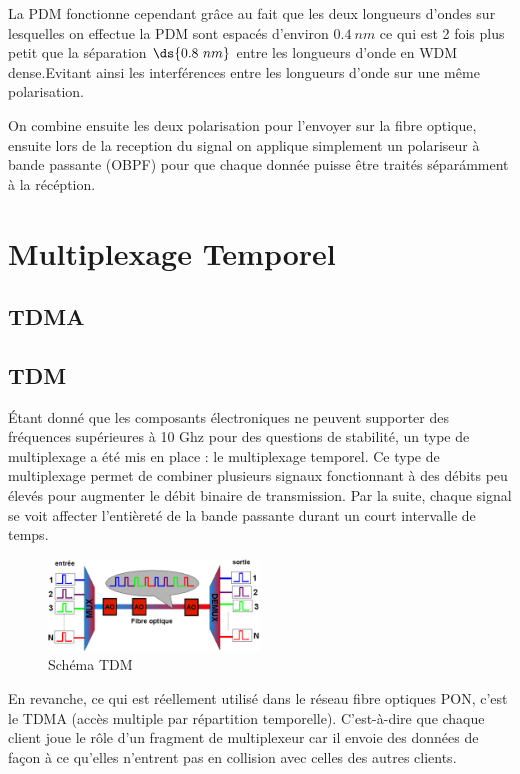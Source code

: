 \documentclass[oneside]{book}
\begin{document}
		La PDM fonctionne cependant grâce au fait que les deux longueurs d'ondes sur lesquelles on effectue la PDM sont espacés d'environ $0.4\ nm$ ce qui est 2 fois plus petit que la séparation $\ds{0.8\ nm}$ entre les longueurs d'onde en WDM dense\cite{DWDM}.Evitant ainsi les interférences entre les longueurs d'onde sur une même polarisation.

		On combine ensuite les deux polarisation pour l'envoyer sur la fibre optique, ensuite lors de la reception du signal on applique simplement un polariseur à bande passante (OBPF) pour que chaque donnée puisse être traités séparámment à la récéption.   

		\section{Multiplexage Temporel}

		\subsection{TDMA}

		\subsection{TDM}

		Étant donné que les composants électroniques ne peuvent supporter des fréquences supérieures à 10 Ghz pour des questions de stabilité, un type de multiplexage a été mis en place : le multiplexage temporel. Ce type de multiplexage permet de combiner plusieurs signaux fonctionnant à des débits peu élevés pour augmenter le débit binaire de transmission. Par la suite, chaque signal se voit affecter l’entièreté de la bande passante durant un court intervalle de temps\cite{wiki1}\cite{wiki2}.

		\begin{figure}[ht!]
			\centering
			\includegraphics[width=0.5\textwidth]{./object/TDM.png}
			\caption{Schéma TDM}
		\end{figure}

		En revanche, ce qui est réellement utilisé dans le réseau fibre optiques PON, c’est le TDMA (accès multiple par répartition temporelle). C'est-à-dire que chaque client joue le rôle d’un fragment de multiplexeur car il envoie des données de façon à ce qu’elles n’entrent pas en collision avec celles des autres clients.
\end{document}

